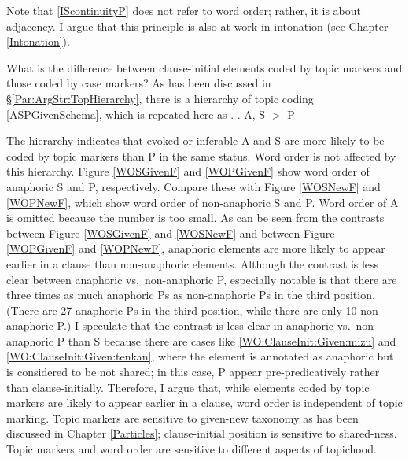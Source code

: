 Note that \ref{IScontinuityP} does not refer to word order;
rather, it is about adjacency.
I argue that this principle is also at work in intonation (see Chapter \ref{Intonation}).

What is the difference between clause-initial elements coded by topic markers and those coded by case markers?
As has been discussed in \S \ref{Par:ArgStr:TopHierarchy},
there is a hierarchy of topic coding \ref{ASPGivenSchema},
which is repeated here as \Next.
%
\ex.
 A, S $>$ P

The hierarchy indicates that
evoked or inferable A and S are more likely to be coded by topic markers than P in the same status.
Word order is not affected by this hierarchy.
Figure \ref{WOSGivenF} and \ref{WOPGivenF} show word order of
anaphoric S and P, respectively.
Compare these with Figure \ref{WOSNewF} and \ref{WOPNewF},
which show word order of non-anaphoric S and P.
Word order of A is omitted because the number is too small.
As can be seen from the contrasts between Figure \ref{WOSGivenF} and \ref{WOSNewF} and between Figure \ref{WOPGivenF} and \ref{WOPNewF},
anaphoric elements are more likely to appear earlier in a clause than non-anaphoric elements.
Although the contrast is less clear between anaphoric vs.~non-anaphoric P,
especially notable is that there are three times as much anaphoric Ps as non-anaphoric Ps in the third position.
(There are 27 anaphoric Ps in the third position,
while there are only 10 non-anaphoric P.)
I speculate that the contrast is less clear in anaphoric vs.~non-anaphoric P than S because there are cases like \ref{WO:ClauseInit:Given:mizu} and \ref{WO:ClauseInit:Given:tenkan},
where the element is annotated as anaphoric but is considered to be not shared;
in this case, P appear pre-predicatively rather than clause-initially.
Therefore, I argue that,
while elements coded by topic markers are likely to appear earlier in a clause,
word order is independent of topic marking.
Topic markers are sensitive to given-new taxonomy as has been discussed in Chapter \ref{Particles};
clause-initial position is sensitive to shared-ness.
Topic markers and word order are sensitive to different aspects of topichood.

